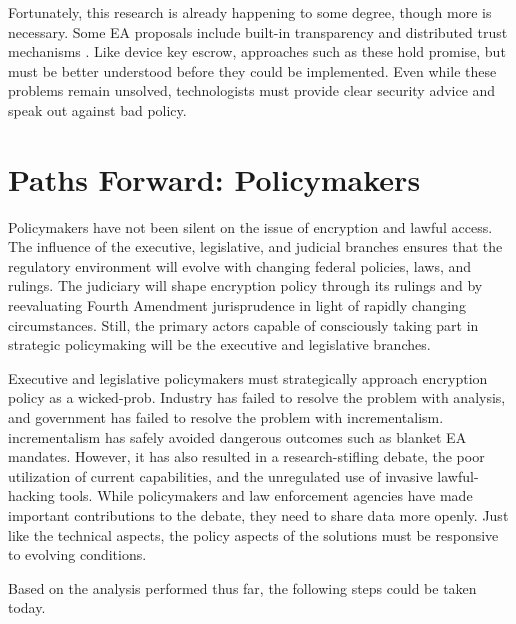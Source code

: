 Fortunately, this research is already happening to some degree, though more is necessary. Some \ac{EA} proposals include
built-in transparency and distributed trust mechanisms \cite{goos_oblivious_1996} \cite{phan_key_2017}
\cite{servan_schreiber_jje_2020}. Like device key escrow, approaches such as these hold promise, but must be better
understood before they could be implemented. Even while these problems remain unsolved, technologists must provide clear
security advice and speak out against bad policy.


\section{Paths Forward: Policymakers}


Policymakers have not been silent on the issue of encryption and lawful access. The influence of the executive,
legislative, and judicial branches ensures that the regulatory environment will evolve with changing federal policies,
laws, and rulings. The judiciary will shape encryption policy through its rulings and by reevaluating Fourth Amendment
jurisprudence in light of rapidly changing circumstances. Still, the primary actors capable of consciously taking part
in strategic policymaking will be the executive and legislative branches.

Executive and legislative policymakers must strategically approach encryption policy as a \ac{wicked-prob}. Industry has
failed to resolve the problem with analysis, and government has failed to resolve the problem with \ac{incrementalism}.
\Ac{incrementalism} has safely avoided dangerous outcomes such as blanket \ac{EA} mandates. However, it has also
resulted in a research-stifling debate, the poor utilization of current capabilities, and the unregulated use of
invasive \ac{lawful-hacking} tools. While policymakers and law enforcement agencies have made important contributions to
the debate, they need to share data more openly. Just like the technical aspects, the policy aspects of the solutions
must be responsive to evolving conditions.

Based on the analysis performed thus far, the following steps could be taken today.

